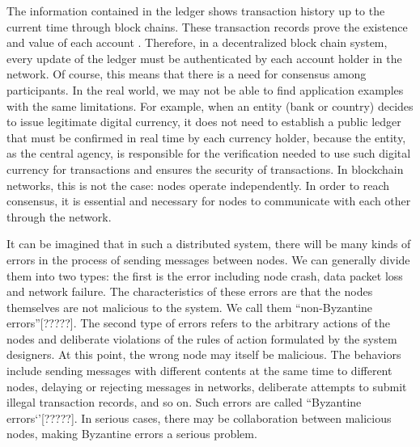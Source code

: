 \documentclass[doublespacing]{bmcart}
\begin{document}
\begin{CJK*}{UTF8}{gbsn}
	The information contained in the ledger shows transaction history up to the current time through block chains. These transaction records prove the existence and value of each account%
	. Therefore, in a decentralized block chain system, every update of the ledger must be authenticated by each account holder in the network. Of course, this means that there is a need for consensus among participants. In the real world, we may not be able to find application examples with the same limitations. For example, when an entity (bank or country) decides to issue legitimate digital currency, it does not need to establish a public ledger that must be confirmed in real time by each currency holder, because the entity, as the central agency, is responsible for the verification needed to use such digital currency for transactions and ensures the security of transactions. In blockchain networks, this is not the case: nodes operate independently. In order to reach consensus, it is essential and necessary for nodes to communicate with each other through the network.

It can be imagined that in such a distributed system, there will be many kinds of errors in the process of sending messages between nodes. We can generally divide them into two types: the first is the error including node crash, data packet loss and network failure. The characteristics of these errors are that the nodes themselves are not malicious to the system. We call them ``non-Byzantine errors''[?????]. The second type of errors refers to the arbitrary actions of the nodes and deliberate violations of the rules of action formulated by the system designers. At this point, the wrong node may itself be malicious. The behaviors include sending messages with different contents at the same time to different nodes, delaying or rejecting messages in networks, deliberate attempts to submit illegal transaction records, and so on. Such errors are called ``Byzantine errors‘’[?????]. In serious cases, there may be collaboration between malicious nodes, making Byzantine errors a serious problem.


\end{CJK*}
\end{document}
